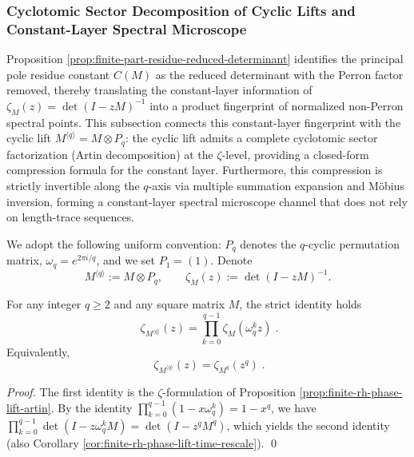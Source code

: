 \subsubsection{Cyclotomic Sector Decomposition of Cyclic Lifts and Constant-Layer Spectral Microscope}\label{subsec:finite-part-cyclic-lift-cyclotomic-microscope}
Proposition \ref{prop:finite-part-residue-reduced-determinant} identifies the principal pole residue constant \(C(M)\) as the reduced determinant with the Perron factor removed,
thereby translating the constant-layer information of \(\zeta_M(z)=\det(I-zM)^{-1}\) into a product fingerprint of normalized non-Perron spectral points.
This subsection connects this constant-layer fingerprint with the cyclic lift \(M^{\langle q\rangle}=M\otimes P_q\): the cyclic lift admits a complete cyclotomic sector factorization (Artin decomposition) at the \(\zeta\)-level, providing a closed-form compression formula for the constant layer. Furthermore, this compression is strictly invertible along the \(q\)-axis via multiple summation expansion and Möbius inversion, forming a constant-layer spectral microscope channel that does not rely on length-trace sequences.
\par
We adopt the following uniform convention: \(P_q\) denotes the \(q\)-cyclic permutation matrix, \(\omega_q=e^{2\pi i/q}\), and we set \(P_1=(1)\).
Denote
\[
M^{\langle q\rangle}:=M\otimes P_q,\qquad
\zeta_M(z):=\det(I-zM)^{-1}.
\]

\begin{proposition}\label{prop:finite-part-cyclic-lift-cyclotomic-sector}
For any integer \(q\ge 2\) and any square matrix \(M\), the strict identity holds
\[
\boxed{\;
\zeta_{M^{\langle q\rangle}}(z)=\prod_{k=0}^{q-1}\zeta_M(\omega_q^{k}z)\; }.
\]
Equivalently,
\[
\boxed{\;
\zeta_{M^{\langle q\rangle}}(z)=\zeta_{M^{q}}(z^{q})\; }.
\]
\end{proposition}
\begin{proof}
The first identity is the \(\zeta\)-formulation of Proposition \ref{prop:finite-rh-phase-lift-artin}.
By the identity \(\prod_{k=0}^{q-1}(1-x\omega_q^k)=1-x^q\), we have
\(
\prod_{k=0}^{q-1}\det(I-z\omega_q^kM)=\det(I-z^qM^q)
\),
which yields the second identity (also Corollary \ref{cor:finite-rh-phase-lift-time-rescale}). \qed
\end{proof}

